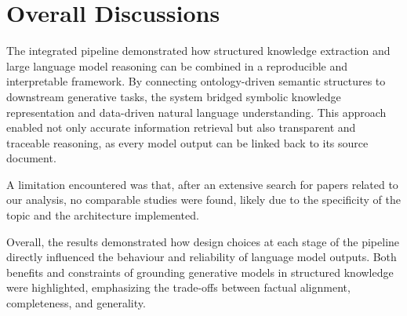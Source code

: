 \section{Overall Discussions}

The integrated pipeline demonstrated how structured knowledge extraction and large language model reasoning can be combined in a reproducible and interpretable framework. By connecting ontology-driven semantic structures to downstream generative tasks, the system bridged symbolic knowledge representation and data-driven natural language understanding. This approach enabled not only accurate information retrieval but also transparent and traceable reasoning, as every model output can be linked back to its source document.

A limitation encountered was that, after an extensive search for papers related to our analysis, no comparable studies were found, likely due to the specificity of the topic and the architecture implemented. 

Overall, the results demonstrated how design choices at each stage of the pipeline directly influenced the behaviour and reliability of language model outputs. Both benefits and constraints of grounding generative models in structured knowledge were highlighted, emphasizing the trade-offs between factual alignment, completeness, and generality.